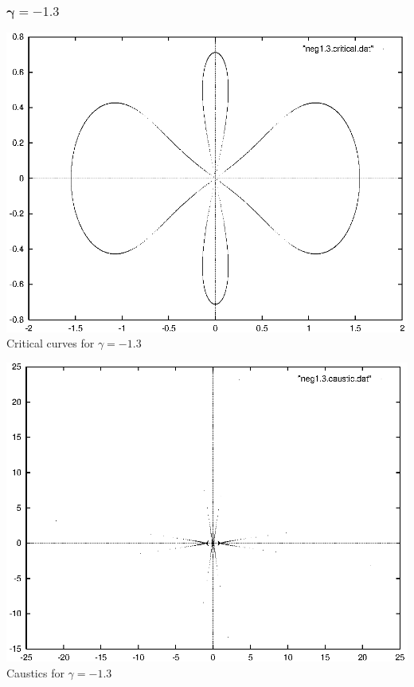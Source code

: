 \documentclass[a4paper]{IEEEtran}
\begin{document}
    \subsubsection{$\mathbf{\gamma = -1.3}$}
    \begin{center}
        \includegraphics{images/neg1-3-critical.eps} 
        \\[1mm]
        Critical curves for $\gamma = -1.3$
    \end{center}
    \begin{center}
        \includegraphics{images/neg1-3-caustic.eps} 
        \\[1mm]
        Caustics for $\gamma = -1.3$
    \end{center}
\end{document}
